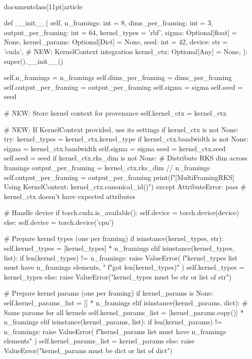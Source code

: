 \\documentclass[11pt]{article}
\begin{document}
\begin{CodeBlock}
    def __init__(
        self,
        n_framings: int = 8,
        dims_per_framing: int = 3,
        output_per_framing: int = 64,
        kernel_types = 'rbf',
        sigma: Optional[float] = None,
        kernel_params: Optional[Dict] = None,
        seed: int = 42,
        device: str = 'cuda',
        # NEW: KernelContext integration
        kernel_ctx: Optional[Any] = None,
    ):
        super().__init__()
        
        self.n_framings = n_framings
        self.dims_per_framing = dims_per_framing
        self.output_per_framing = output_per_framing
        self.sigma = sigma
        self.seed = seed
        
        # NEW: Store kernel context for provenance
        self.kernel_ctx = kernel_ctx
        
        # NEW: If KernelContext provided, use its settings
        if kernel_ctx is not None:
            try:
                kernel_types = kernel_ctx.kernel_type
                if kernel_ctx.bandwidth is not None:
                    sigma = kernel_ctx.bandwidth
                    self.sigma = sigma
                seed = kernel_ctx.seed
                self.seed = seed
                if kernel_ctx.rks_dim is not None:
                    # Distribute RKS dim across framings
                    output_per_framing = kernel_ctx.rks_dim // n_framings
                    self.output_per_framing = output_per_framing
                print(f"[MultiFramingRKS] Using KernelContext: {kernel_ctx.canonical_id()}")
            except AttributeError:
                pass  # kernel_ctx doesn't have expected attributes
        
        # Handle device
        if torch.cuda.is_available():
            self.device = torch.device(device)
        else:
            self.device = torch.device('cpu')
        
        # Prepare kernel types (one per framing)
        if isinstance(kernel_types, str):
            self.kernel_types = [kernel_types] * n_framings
        elif isinstance(kernel_types, list):
            if len(kernel_types) != n_framings:
                raise ValueError(
                    f"kernel_types list must have {n_framings} elements, "
                    f"got {len(kernel_types)}"
                )
            self.kernel_types = kernel_types
        else:
            raise ValueError("kernel_types must be str or list of str")
        
        # Prepare kernel params (one per framing)
        if kernel_params is None:
            self.kernel_params_list = [{}] * n_framings
        elif isinstance(kernel_params, dict):
            # Same params for all kernels
            self.kernel_params_list = [kernel_params.copy()] * n_framings
        elif isinstance(kernel_params, list):
            if len(kernel_params) != n_framings:
                raise ValueError(
                    f"kernel_params list must have {n_framings} elements"
                )
            self.kernel_params_list = kernel_params
        else:
            raise ValueError("kernel_params must be dict or list of dict")
        

\end{CodeBlock}
\end{document}
